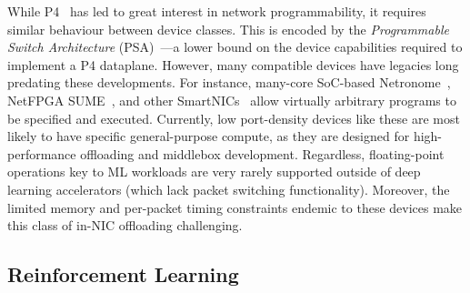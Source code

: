 \documentclass[
conference
,10pt
]{IEEEtran}
\begin{document}
While P4~\parencite{DBLP:journals/ccr/BosshartDGIMRSTVVW14} has led to great interest in network programmability, it requires similar behaviour between device classes.
This is encoded by the \emph{Programmable Switch Architecture} (PSA)~\parencite{p4-psa}---a lower bound on the device capabilities required to implement a P4 dataplane.
However, many compatible devices have legacies long predating these developments. 
For instance, many-core SoC-based Netronome~\parencite{netronome-smartnic}, NetFPGA SUME~\parencite{DBLP:journals/micro/ZilbermanACM14,DBLP:conf/fpga/IbanezBMZ19}, and other SmartNICs~\parencite{nvidia-bluefield,xilinx-alveo} allow virtually arbitrary programs to be specified and executed.
Currently, low port-density devices like these are most likely to have specific general-purpose compute, as they are designed for high-performance offloading and middlebox development.
Regardless, floating-point operations key to ML workloads are very rarely supported outside of deep learning accelerators (which lack packet switching functionality).
Moreover, the limited memory and per-packet timing constraints endemic to these devices make this class of in-NIC offloading challenging.


\subsection{Reinforcement Learning}
%
\end{document}

